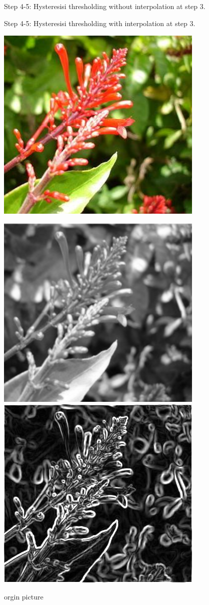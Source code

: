\documentclass[10pt,twocolumn,letterpaper]{article}
\begin{document}
\begin{figure}[htp]
\begin{center}
		\caption{Step 4-5: Hysteresisi thresholding without interpolation at step 3. }
		\caption{Step 4-5: Hysteresisi thresholding with interpolation at step 3. }
		\label{fig:long}
	\end{center}
\end{figure}

\begin{figure}[htp]
	\begin{center}
		\includegraphics[width=1\linewidth]{../../code/tree.png} \\ 
		\caption{orgin picture}
		\includegraphics[width=.473\linewidth]{../../code/cannyGuassianTree.png} \quad
		\includegraphics[width=.473\linewidth]{../../code/cannySobelTree.png} \\

\end{center}
\end{figure}
\end{document}
